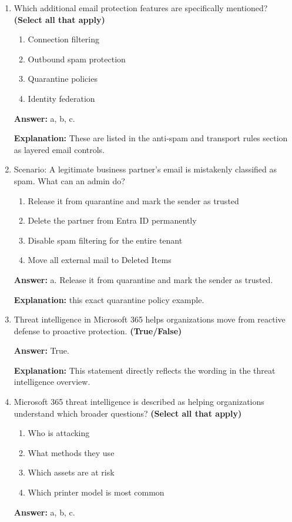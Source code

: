 \documentclass[10pt]{article}
\begin{document}
\begin{enumerate}[leftmargin=*]
\textbf{Explanation:} this specific type of mail flow rule example to reduce financial fraud.

\item Which additional email protection features are specifically mentioned? \textbf{(Select all that apply)}
\begin{enumerate}[label=\alph*., leftmargin=1.5em]
\item Connection filtering
\item Outbound spam protection
\item Quarantine policies
\item Identity federation
\end{enumerate}
\textbf{Answer:} a, b, c.

\textbf{Explanation:} These are listed in the anti-spam and transport rules section as layered email controls.

\item Scenario: A legitimate business partner’s email is mistakenly classified as spam. What can an admin do?
\begin{enumerate}[label=\alph*., leftmargin=1.5em]
\item Release it from quarantine and mark the sender as trusted
\item Delete the partner from Entra ID permanently
\item Disable spam filtering for the entire tenant
\item Move all external mail to Deleted Items
\end{enumerate}
\textbf{Answer:} a. Release it from quarantine and mark the sender as trusted.

\textbf{Explanation:} this exact quarantine policy example.

\item Threat intelligence in Microsoft 365 helps organizations move from reactive defense to proactive protection. \textbf{(True/False)}

\textbf{Answer:} True.

\textbf{Explanation:} This statement directly reflects the wording in the threat intelligence overview.

\item Microsoft 365 threat intelligence is described as helping organizations understand which broader questions? \textbf{(Select all that apply)}
\begin{enumerate}[label=\alph*., leftmargin=1.5em]
\item Who is attacking
\item What methods they use
\item Which assets are at risk
\item Which printer model is most common
\end{enumerate}
\textbf{Answer:} a, b, c.


\end{enumerate}
\end{document}
